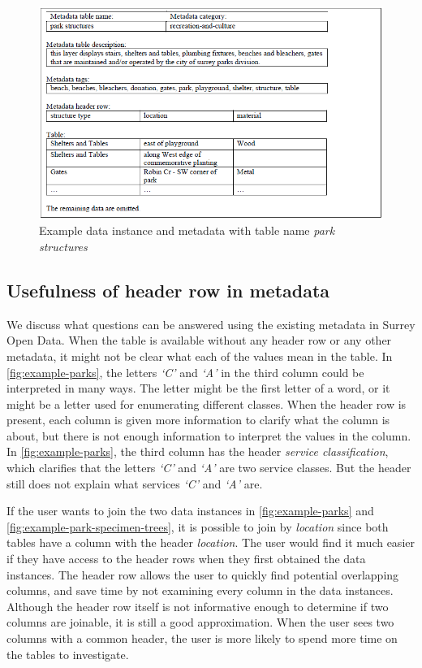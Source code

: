 \begin{figure}
    \centering
    \includegraphics[width=5in]{figures/example-park-structures.png}
    \caption{Example data instance and metadata with table name \textit{park structures}}
    \label{fig:example-park-structures}
\end{figure}

\subsection{Usefulness of header row in metadata}

We discuss what questions can be answered using the existing metadata in Surrey Open Data. When the table is available without any header row or any other metadata, it might not be clear what each of the values mean in the table. In \autoref{fig:example-parks}, the letters \textit{`C'} and \textit{`A'} in the third column could be interpreted in many ways. The letter might be the first letter of a word, or it might be a letter used for enumerating different classes. When the header row is present, each column is given more information to clarify what the column is about, but there is not enough information to interpret the values in the column. In \autoref{fig:example-parks}, the third column has the header \textit{service classification}, which clarifies that the letters \textit{`C'} and \textit{`A'} are two service classes. But the header still does not explain what services \textit{`C'} and \textit{`A'} are.

If the user wants to join the two data instances in \autoref{fig:example-parks} and \autoref{fig:example-park-specimen-trees}, it is possible to join by \textit{location} since both tables have a column with the header \textit{location}. The user would find it much easier if they have access to the header rows when they first obtained the data instances. The header row allows the user to quickly find potential overlapping columns, and save time by not examining every column in the data instances. Although the header row itself is not informative enough to determine if two columns are joinable, it is still a good approximation. When the user sees two columns with a common header, the user is more likely to spend more time on the tables to investigate.

